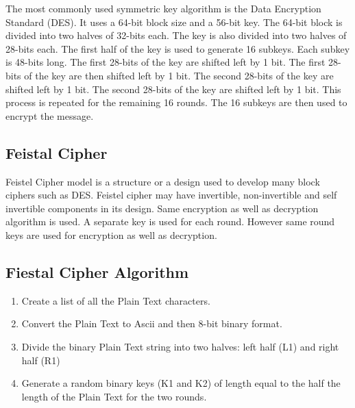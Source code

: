 \documentclass[openany]{book}
\begin{document}
The most commonly used symmetric key algorithm is the Data Encryption Standard (DES). It uses a 64-bit block size and a 56-bit key. The 64-bit block is divided into two halves of 32-bits each. The key is also divided into two halves of 28-bits each. The first half of the key is used to generate 16 subkeys. Each subkey is 48-bits long. The first 28-bits of the key are shifted left by 1 bit. The first 28-bits of the key are then shifted left by 1 bit. The second 28-bits of the key are shifted left by 1 bit. The second 28-bits of the key are shifted left by 1 bit. This process is repeated for the remaining 16 rounds. The 16 subkeys are then used to encrypt the message.

\subsection{Feistal Cipher}

Feistel Cipher model is a structure or a design used to develop many block ciphers such as DES. Feistel cipher may have invertible, non-invertible and self invertible components in its design. Same encryption as well as decryption algorithm is used. A separate key is used for each round. However same round keys are used for encryption as well as decryption.

\subsection{Fiestal Cipher Algorithm}

\begin{enumerate}
	\item Create a list of all the Plain Text characters.

	\item Convert the Plain Text to Ascii and then 8-bit binary format.

	\item Divide the binary Plain Text string into two halves: left half (L1) and right half (R1)

	\item Generate a random binary keys (K1 and K2) of length equal to the half the length of the Plain Text for the two rounds.

\end{enumerate}
\end{document}
